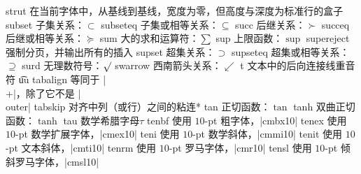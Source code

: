 \capcs strut {在当前字体中，从基线到基线，宽度为零，但高度与深度为标准行的盒子}{}{}
\capcs subset {子集关系：$\subset$}{}{}
\capcs subseteq {子集或相等关系：$\subseteq$}{}{}
\capcs succ {后继关系：$\succ$}{}{}
\capcs succeq {后继或相等关系：$\succeq$}{}{}
\capcs sum {大的求和运算符：$\sum$}{}{}
\capcs sup {上限函数：$\sup$}{}{}
\capcs supereject {强制分页，并输出所有的插入}{}{}
\capcs supset {超集关系：$\supset$}{}{}
\capcs supseteq {超集或相等关系：$\supseteq$}{}{}
\capcs surd {无理数符号：$\surd$}{}{}
\capcs swarrow {西南箭头关系：$\swarrow$}{}{}
\capcs t {文本中的后向连接线重音符 \t uu}{}{}
\capcs tabalign {等同于 |\\+|，除了它不是 |\\outer|}{}{}
\capcs tabskip {对齐中列（或行）之间的粘连}*{}
\capcs tan {正切函数：$\tan$}{}{}
\capcs tanh {双曲正切函数：$\tanh$}{}{}
\capcs tau {数学希腊字母$\tau$}{}{}
\capcs tenbf {使用 $10$-pt 粗字体，|cmbx10|}{}{}
\capcs tenex {使用 $10$-pt 数学扩展字体，|cmex10|}{}{}
\capcs teni {使用 $10$-pt 数学斜体，|cmmi10|}{}{}
\capcs tenit {使用 $10$-pt 文本斜体，|cmti10|}{}{}
\capcs tenrm {使用 $10$-pt 罗马字体，|cmr10|}{}{}
\capcs tensl {使用 $10$-pt 倾斜罗马字体，|cmsl10|}{}{}
